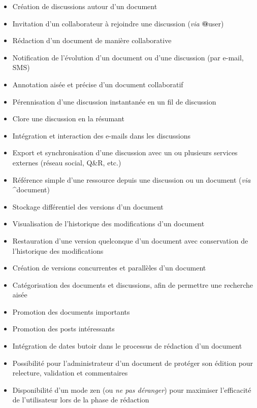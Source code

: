 \documentclass[10pt,twocolumn,a4paper,utf8x]{article}
\begin{document}
\begin{itemize}
\itemsep1pt\parskip0pt
\item
  Création de discussions autour d'un document
\item
  Invitation d'un collaborateur à rejoindre une discussion (\emph{via}
  \textbf{@}user)
\item
  Rédaction d'un document de manière collaborative
\item
  Notification de l'évolution d'un document ou d'une discussion (par
  e-mail, SMS)
\item
  Annotation aisée et précise d'un document collaboratif
\item
  Pérennisation d'une discussion instantanée en un fil de discussion
\item
  Clore une discussion en la résumant
\item
  Intégration et interaction des e-mails dans les discussions
\item
  Export et synchronisation d'une discussion avec un ou plusieurs
  services externes (réseau social, Q\&R, etc.)
\item
  Référence simple d'une ressource depuis une discussion ou un document
  (\emph{via} \textbf{\^{}}document)
\item
  Stockage différentiel des versions d'un document
\item
  Visualisation de l'historique des modifications d'un document
\item
  Restauration d'une version quelconque d'un document avec conservation
  de l'historique des modifications
\item
  Création de versions concurrentes et parallèles d'un document
\item
  Catégorisation des documents et discussions, afin de permettre une
  recherche aisée
\item
  Promotion des documents importants
\item
  Promotion des posts intéressants
\item
  Intégration de dates butoir dans le processus de rédaction d'un
  document
\item
  Possibilité pour l'administrateur d'un document de protéger son
  édition pour relecture, validation et commentaires
\item
  Disponibilité d'un mode zen (ou \emph{ne pas déranger}) pour maximiser
  l'efficacité de l'utilisateur lors de la phase de rédaction
\end{itemize}
\end{document}
